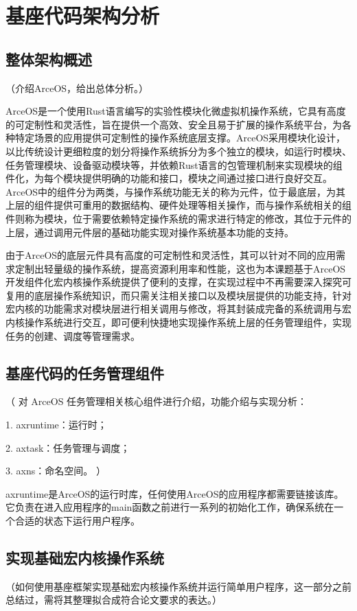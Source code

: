 
\chapter{基座代码架构分析}

\section{整体架构概述}

（介绍ArceOS，给出总体分析。）

ArceOS是一个使用Rust语言编写的实验性模块化微虚拟机操作系统，它具有高度的可定制性和灵活性，旨在提供一个高效、安全且易于扩展的操作系统平台，为各种特定场景的应用提供可定制性的操作系统底层支撑。ArceOS采用模块化设计，以比传统设计更细粒度的划分将操作系统拆分为多个独立的模块，如运行时模块、任务管理模块、设备驱动模块等，并依赖Rust语言的包管理机制来实现模块的组件化，为每个模块提供明确的功能和接口，模块之间通过接口进行良好交互。ArceOS中的组件分为两类，与操作系统功能无关的称为元件，位于最底层，为其上层的组件提供可重用的数据结构、硬件处理等相关操作，而与操作系统相关的组件则称为模块，位于需要依赖特定操作系统的需求进行特定的修改，其位于元件的上层，通过调用元件层的基础功能实现对操作系统基本功能的支持。

由于ArceOS的底层元件具有高度的可定制性和灵活性，其可以针对不同的应用需求定制出轻量级的操作系统，提高资源利用率和性能，这也为本课题基于ArceOS开发组件化宏内核操作系统提供了便利的支撑，在实现过程中不再需要深入探究可复用的底层操作系统知识，而只需关注相关接口以及模块层提供的功能支持，针对宏内核的功能需求对模块层进行相关调用与修改，将其封装成完备的系统调用与宏内核操作系统进行交互，即可便利快捷地实现操作系统上层的任务管理组件，实现任务的创建、调度等管理需求。


\section{基座代码的任务管理组件}

（
对 ArceOS 任务管理相关核心组件进行介绍，功能介绍与实现分析：

1. axruntime：运行时；

2. axtask：任务管理与调度；

3. axns：命名空间。
）

axruntime是ArceOS的运行时库，任何使用ArceOS的应用程序都需要链接该库。它负责在进入应用程序的main函数之前进行一系列的初始化工作，确保系统在一个合适的状态下运行用户程序。




\section{实现基础宏内核操作系统}

（如何使用基座框架实现基础宏内核操作系统并运行简单用户程序，这一部分之前总结过，需将其整理拟合成符合论文要求的表达。）


